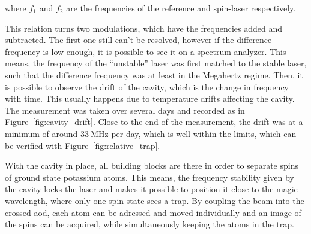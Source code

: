 where $f_1$ and $f_2$ are the frequencies of the reference and spin-laser respectively.

This relation turns two modulations, which have the frequencies added and subtracted. The first one still can't be resolved, however if the difference frequency is low enough, it is possible to see it on a spectrum analyzer. This means, the frequency of the ``unstable'' laser was first matched to the stable laser, such that the difference frequency was at least in the Megahertz regime. Then, it is possible to observe the drift of the cavity, which is the change in frequency with time. This usually happens due to temperature drifts affecting the cavity. The measurement was taken over several days and recorded as in Figure~\ref{fig:cavity_drift}. Close to the end of the measurement, the drift was at a minimum of around $\SI{33}{\mega\hertz}$ per day, which is well within the limits, which can be verified with Figure~\ref{fig:relative_trap}.

With the cavity in place, all building blocks are there in order to separate spins of ground state potassium atoms. This means, the frequency stability given by the cavity locks the laser and makes it possible to position it close to the magic wavelength, where only one spin state sees a trap. By coupling the beam into the crossed \ac{aod}, each atom can be adressed and moved individually and an image of the spins can be acquired, while simultaneously keeping the atoms in the trap.

\begin{figure}[t]%
\end{figure}
